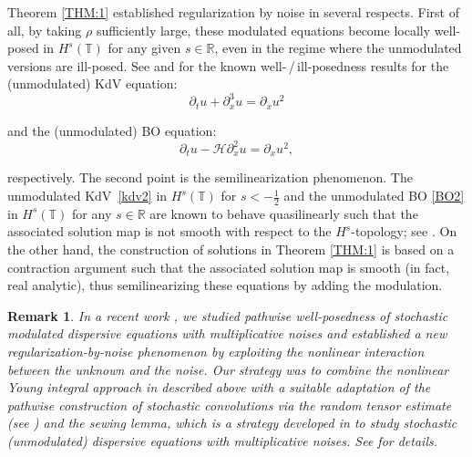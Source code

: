 \documentclass[letterpaper, 11pt,  reqno]{amsart}
\newtheorem{remark}[theorem]{Remark}
\newcommand{\1}{\hspace{0.5mm}\text{I}\hspace{0.5mm}}
\newcommand{\noi}{\noindent}
\newcommand{\R}{\mathbb{R}}
\newcommand{\T}{\mathbb{T}}
\renewcommand{\H}{\mathcal{H}}
\newcommand{\dx}{\partial_x}
\newcommand{\dt}{\partial_t}
\numberwithin{equation}{section}
\numberwithin{theorem}{section}
\begin{document}
Theorem \ref{THM:1}
established regularization by noise
in several respects.
First of all, by taking $\rho$ sufficiently large, 
these  modulated equations
become locally well-posed
in $H^s(\T)$ for
any given $s \in \R$, 
even in the regime
where the unmodulated versions
are ill-posed.
See
\cite{KPV96, CKSTT03, 
KT1, M12,  KV19}
and 
\cite{Moli1, Moli2, 
Deng15, 
GKT23, KLV}
for the known well-\,/\,ill-posedness
results
for the (unmodulated) KdV equation:
\begin{equation}
\dt u+  \dx^3 u  =\dx u^2
\label{kdv2}
\end{equation}



\noi
and 
the (unmodulated) BO equation:
\begin{equation}
\label{BO2}
\dt u-    \H\dx^2 u  =\dx u^2,
\end{equation}

\noi
respectively.
The second point is the 
 semilinearization phenomenon.
The unmodulated 
KdV~\eqref{kdv2}
in $H^s(\T)$ for $s <  - \frac 12$
and
the unmodulated BO \eqref{BO2}
in $H^s(\T)$
 for  any $s \in \R$
are known to behave quasilinearly
such that 
the associated solution map 
is not smooth with respect to the $H^s$-topology;
see  \cite{BO97, MST, CCT,  GKT24}.
On the other hand, 
the construction of solutions in 
Theorem \ref{THM:1} 
is 
 based on a contraction argument
 such that the associated solution map
 is smooth (in fact, real analytic), 
thus  semilinearizing 
these equations
by adding  the modulation.


\begin{remark}\rm 
In a recent work \cite{CGLLO2}, we studied
pathwise well-posedness of stochastic modulated dispersive equations
with multiplicative noises
and established a new 
regularization-by-noise phenomenon by exploiting the nonlinear interaction between the unknown and the noise.
Our strategy was 
to combine
the nonlinear Young integral approach in \cite{CGLLO1}
described above
with a suitable adaptation of 
the pathwise construction
of  stochastic convolutions
via 
the random tensor estimate (see \cite{DNY3, OWZ, OW3}) 
and the sewing lemma, 
which is a strategy
developed in \cite{CLO2, COZ}
to study
 stochastic (unmodulated) dispersive equations with multiplicative noises. 
See \cite{CGLLO2} for details.









\end{remark}
\end{document}
